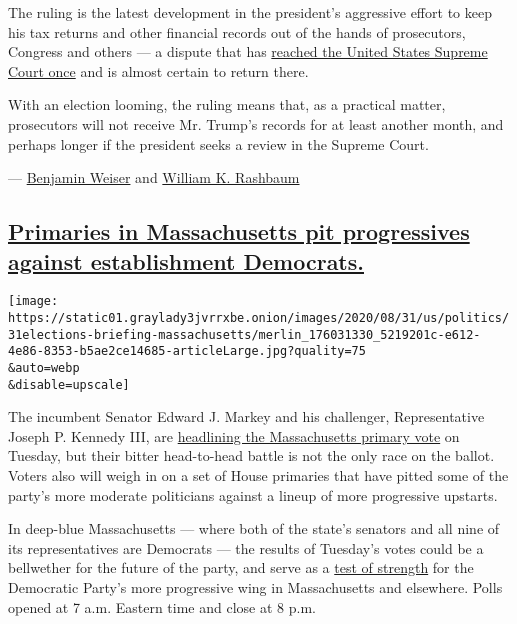 The ruling is the latest development in the president's aggressive
effort to keep his tax returns and other financial records out of the
hands of prosecutors, Congress and others --- a dispute that has
\href{https://www.nytimes3xbfgragh.onion/2020/07/10/nyregion/donald-trump-taxes-cy-vance.html}{reached
the United States Supreme Court once} and is almost certain to return
there.

With an election looming, the ruling means that, as a practical matter,
prosecutors will not receive Mr. Trump's records for at least another
month, and perhaps longer if the president seeks a review in the Supreme
Court.

---
\href{https://www.nytimes3xbfgragh.onion/by/benjamin-weiser}{Benjamin
Weiser} and
\href{https://www.nytimes3xbfgragh.onion/by/william-k-rashbaum}{William
K. Rashbaum}

\hypertarget{primaries-in-massachusetts-pit-progressives-against-establishment-democrats}{%
\subsection{\texorpdfstring{\protect\hyperlink{primaries-in-massachusetts-pit-progressives-against-establishment-democrats}{Primaries
in Massachusetts pit progressives against establishment
Democrats.}}{Primaries in Massachusetts pit progressives against establishment Democrats.}}\label{primaries-in-massachusetts-pit-progressives-against-establishment-democrats}}

\texttt{[image: https://static01.graylady3jvrrxbe.onion/images/2020/08/31/us/politics/31elections-briefing-massachusetts/merlin\_176031330\_5219201c-e612-4e86-8353-b5ae2ce14685-articleLarge.jpg?quality=75\\\&auto=webp\\\&disable=upscale]}

The incumbent Senator Edward J. Markey and his challenger,
Representative Joseph P. Kennedy III, are
\href{https://www.nytimes3xbfgragh.onion/2020/08/31/us/markey-kennedy-massachusetts-senate.html}{headlining
the Massachusetts primary vote} on Tuesday, but their bitter
head-to-head battle is not the only race on the ballot. Voters also will
weigh in on a set of House primaries that have pitted some of the
party's more moderate politicians against a lineup of more progressive
upstarts.

In deep-blue Massachusetts --- where both of the state's senators and
all nine of its representatives are Democrats --- the results of
Tuesday's votes could be a bellwether for the future of the party, and
serve as a
\href{https://www.nytimes3xbfgragh.onion/2020/08/05/us/politics/election-primary-results.html}{test
of strength} for the Democratic Party's more progressive wing in
Massachusetts and elsewhere. Polls opened at 7 a.m. Eastern time and
close at 8 p.m.

